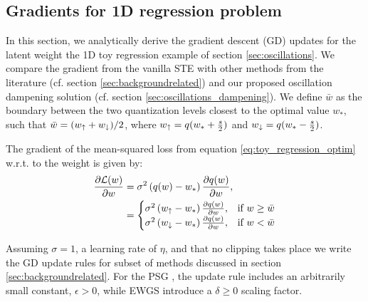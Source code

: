 \subsection{Gradients for 1D regression problem}
\label{app:toy_example_gradients}
In this section, we analytically derive the gradient descent (GD) updates for the latent weight the 1D toy regression example of section \ref{sec:oscillations}.
We compare the gradient from the vanilla STE with other methods from the literature (cf. section \ref{sec:backgroundrelated}) and our proposed oscillation dampening solution (cf. section \ref{sec:oscillations_dampening}). We define $\bar{w}$ as the boundary between the two quantization levels closest to the optimal value $w_*$, such that $\bar{w}= (w_{\uparrow}+w_{\downarrow})/2$, where $w_{\uparrow}=q(w_*+\frac{s}{2})$  and $w_{\downarrow}=q(w_*-\frac{s}{2})$.

The gradient of the mean-squared loss from equation \eqref{eq:toy_regression_optim} w.r.t. to the weight is given by: 
%
\begin{align} 
    \frac{\partial \mathcal{L}(w)}{\partial w}& =\sigma^2 \left(q(w) - w_* \right)  \frac{\partial q(w)}{\partial w }, \\
    &= \begin{cases}
    \sigma^2 \left(w_{\uparrow} - w_*\right)\frac{\partial q(w)}{\partial w } , & \text{if }w \geq \bar{w} \\
    \sigma^2 \left(w_{\downarrow} - w_* \right) \frac{\partial q(w)}{\partial w },& \text{if } w < \bar{w}\\
    \end{cases} 
    \label{eq:regression_grad_quant}
\end{align}
%

Assuming $\sigma=1$, a learning rate of $\eta$, and that no clipping takes place we write the GD update rules for subset of methods discussed in section \ref{sec:backgroundrelated}. For the PSG \citep{PBGS}, the update rule includes an arbitrarily small constant, $\epsilon>0$, while EWGS  \citep{EWGS} introduce a $\delta \geq 0$ scaling factor. 


